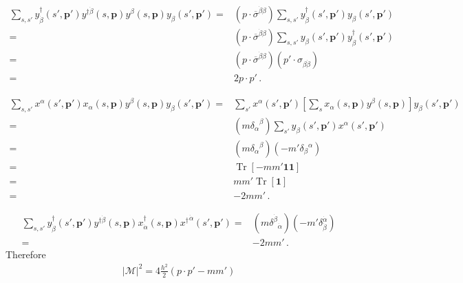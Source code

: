 \begin{align}
\sum_{s,s'}y^{\dagger}_{\dot{\beta}}(s',\boldsymbol{p}')y^{\dagger\dot{\beta}}(s,\boldsymbol{p})y^{\beta}(s,\boldsymbol{p})y_{\beta}(s',\boldsymbol{p}')
=&  \left( p\cdot \overline{\sigma}^{\dot{\beta}\beta} \right)\sum_{s,s'}y^{\dagger}_{\dot{\beta}}(s',\boldsymbol{p}')y_{\beta}(s',\boldsymbol{p}') \nonumber\\
=&  \left( p\cdot \overline{\sigma}^{\dot{\beta}\beta} \right) \sum_{s,s'}y_{\beta}(s',\boldsymbol{p}')y^{\dagger}_{\dot{\beta}}(s',\boldsymbol{p}') \nonumber\\
=&  \left( p\cdot \overline{\sigma}^{\dot{\beta}\beta} \right) \left( p'\cdot \sigma_{\beta \dot{\beta}} \right) \nonumber\\
=& 2 p \cdot p'\,.
\end{align}

\begin{align}
  \sum_{s,s'}x^{\alpha}(s',\boldsymbol{p}') x_{\alpha}(s,\boldsymbol{p})y^{\beta}(s,\boldsymbol{p})y_{\beta}(s',\boldsymbol{p}') =& 
  \sum_{s'}x^{\alpha}(s',\boldsymbol{p}') \left[ \sum_{s} x_{\alpha}(s,\boldsymbol{p})y^{\beta}(s,\boldsymbol{p}) \right]y_{\beta}(s',\boldsymbol{p}') \nonumber\\
 =& \left(m{\delta_{\alpha}}^{\beta}  \right) \sum_{s'}  y_{\beta}(s',\boldsymbol{p}')x^{\alpha}(s',\boldsymbol{p}') \nonumber\\
 =& \left(m{\delta_{\alpha}}^{\beta}  \right)  \left(- m'{{\delta_{\beta}}^{\alpha}}  \right) \nonumber\\
 =& \operatorname{Tr} \left[ -m m'  \boldsymbol{1} \boldsymbol{1} \right] \nonumber\\
 =& mm'\operatorname{Tr} \left[  \boldsymbol{1} \right] \nonumber\\
 =& -2 mm'\,.
\end{align}

\begin{align}
  \sum_{s,s'}y^{\dagger}_{\dot{\beta}}(s',\boldsymbol{p}')y^{\dagger\dot{\beta}}(s,\boldsymbol{p})x^{\dagger}_{\dot{\alpha}}(s,\boldsymbol{p}){x^{\dagger}}^{\dot{\alpha}}(s',\boldsymbol{p}')  
=&   \left( m {\delta^{\dot{\beta}}}_{\dot{\alpha}} \right) \left( -m' {\delta}^{\dot{\alpha}}_{\dot{\beta}} \right) \nonumber\\
=& -2m m'\,.
\end{align}
Therefore
\begin{align}
   \left| \mathcal{M} \right|^2=4 \frac{h^{2}}{2} \left( p\cdot p' - mm' \right)
\end{align}

